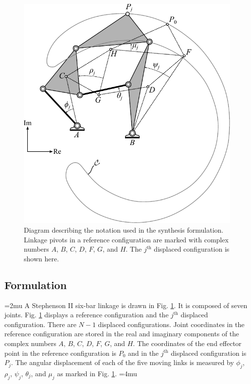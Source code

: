 \documentclass[journal]{IEEEtran}
\begin{document}
\begin{figure}[!b]
\centering
\includegraphics[width=1\linewidth]{synthesis_diagram}
\caption{Diagram describing the notation used in the synthesis formulation.  Linkage pivots in a reference configuration are marked with complex numbers $A$, $B$, $C$, $D$, $F$, $G$, and $H$.  The $j^\text{th}$ displaced configuration is shown here.}
\label{synthesis_diagram}
\end{figure}


\subsection{Formulation}
\label{sec:synth_form}

\medmuskip=2mu
A Stephenson II six-bar linkage is drawn in Fig. \ref{synthesis_diagram}.  It is composed of seven joints.  Fig. \ref{synthesis_diagram} displays a reference configuration and the $j^\text{th}$ displaced configuration.  There are $N-1$ displaced configurations.  Joint coordinates in the reference configuration are stored in the real and imaginary components of the complex numbers $A$, $B$, $C$, $D$, $F$, $G$, and $H$.  The coordinates of the end effector point in the reference configuration is $P_0$ and in the $j^\text{th}$ displaced configuration is $P_j$.  The angular displacement of each of the five moving links is measured by $\phi_j$, $\rho_j$, $\psi_j$, $\theta_j$, and $\mu_j$ as marked in Fig. \ref{synthesis_diagram}.
\medmuskip=4mu
\end{document}
